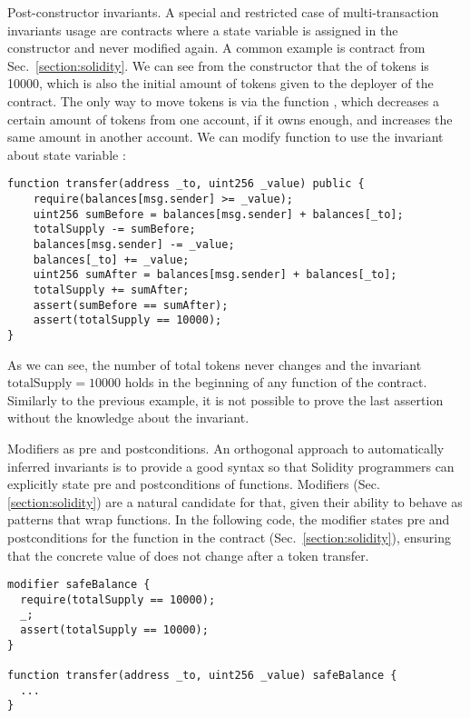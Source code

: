 \begin{paragraph}{Post-constructor invariants.}
A special and restricted case of multi-transaction invariants usage are
contracts where a state variable is assigned in the constructor and never
modified again.
%
A common example is contract  from Sec.~\ref{section:solidity}.
%
We can see from the constructor that the  of tokens is 10000,
which is also the initial amount of tokens given to the deployer of the
contract.
%
The only way to move tokens is via the function , which
decreases a certain amount of tokens from one account, if it owns enough, and
increases the same amount in another account.
%
We can modify function  to use the invariant about state
variable :

\begin{verbatim}
function transfer(address _to, uint256 _value) public {
    require(balances[msg.sender] >= _value);
    uint256 sumBefore = balances[msg.sender] + balances[_to];
    totalSupply -= sumBefore;
    balances[msg.sender] -= _value;
    balances[_to] += _value;
    uint256 sumAfter = balances[msg.sender] + balances[_to];
    totalSupply += sumAfter;
    assert(sumBefore == sumAfter);
    assert(totalSupply == 10000);
}
\end{verbatim}

As we can see, the number of total tokens never changes and the invariant
$\mathrm{totalSupply} = 10000$ holds in the beginning of any function of the
contract.
%
Similarly to the previous example, it is not possible to prove the last
assertion without the knowledge about the invariant.

\end{paragraph}

\begin{paragraph}{Modifiers as pre and postconditions.}
An orthogonal approach to automatically inferred invariants is to provide a
good syntax so that Solidity programmers can explicitly state pre and
postconditions of functions.
%
Modifiers (Sec.\ref{section:solidity}) are a natural candidate for that, given
their ability to behave as patterns that wrap functions.
%
In the following code, the modifier  states pre and
postconditions for the  function in the  contract
(Sec.~\ref{section:solidity}), ensuring that the concrete value of
 does not change after a token transfer.

\begin{verbatim}
modifier safeBalance {
  require(totalSupply == 10000);
  _;
  assert(totalSupply == 10000);
}

function transfer(address _to, uint256 _value) safeBalance {
  ...
}
\end{verbatim}
\end{paragraph}


